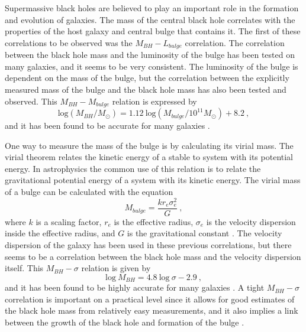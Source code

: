 \documentclass[english, oneside]{HYgradu}
\begin{document}
Supermassive black holes are believed to play an important role in the formation and evolution of galaxies. The mass of the central black hole correlates with the properties of the host galaxy and central bulge that contains it. The first of these correlations to be observed was the $M_{BH} - L_{bulge}$ correlation. The correlation between the black hole mass and the luminosity of the bulge has been tested on many galaxies, and it seems to be very consistent. The luminosity of the bulge is dependent on the mass of the bulge, but the correlation between the explicitly measured mass of the bulge and the black hole mass has also been tested and observed. This $M_{BH} - M_{bulge}$ relation is expressed by
\begin{equation}
\mathrm{log} (M_{BH}/M_{\odot}) = 1.12 \  \mathrm{log} (M_{bulge}/ 10^{11} M_{\odot}) + 8.2 \ ,
\end{equation}
and it has been found to be accurate for many galaxies \citep{haring:2004}.

One way to measure the mass of the bulge is by calculating its virial mass. The virial theorem relates the kinetic energy of a stable to system with its potential energy. In astrophysics the common use of this relation is to relate the gravitational potential energy of a system with its kinetic energy. The virial mass of a bulge can be calculated with the equation
\begin{equation}
M_{bulge} = \frac{k r_e \sigma^2_e}{G} \ ,
\end{equation}
where $k$ is a scaling factor, $r_e$ is the effective radius, $\sigma_e$ is the velocity dispersion inside the effective radius, and $G$ is the gravitational constant \citep{marconi:2003}. The velocity dispersion of the galaxy has been used in these previous correlations, but there seems to be a correlation between the black hole mass and the velocity dispersion itself. This $M_{BH} - \sigma$ relation is given by
\begin{equation}
\mathrm{log} \ M_{BH} = 4.8 \ \mathrm{log} \ \sigma - 2.9 \ , 
\end{equation}
and it has been found to be highly accurate for many galaxies \citep{ferrarese:2000}.
A tight $M_{BH} - \sigma$ correlation is important on a practical level since it allows for good estimates of the black hole mass from relatively easy measurements, and it also implies a link between the growth of the black hole and formation of the bulge \citep{kormendy:2013}.

\end{document}
